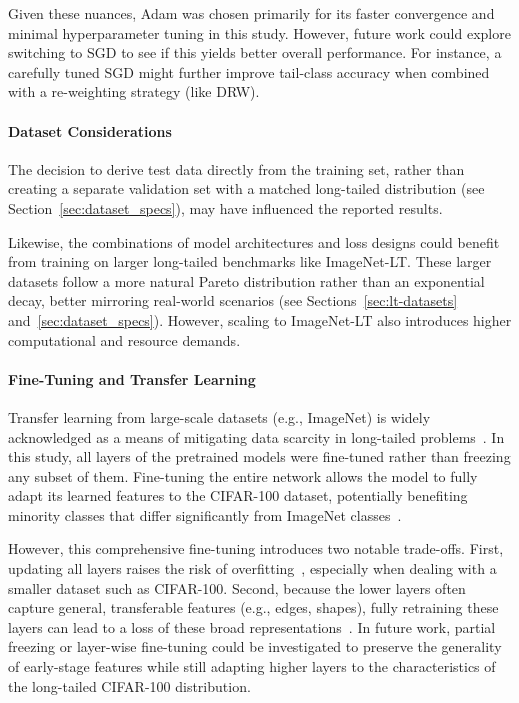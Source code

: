 Given these nuances, Adam was chosen primarily for its faster convergence and minimal hyperparameter tuning in this study. However, future work could explore switching to SGD to see if this yields better overall performance. For instance, a carefully tuned SGD might further improve tail-class accuracy when combined with a re-weighting strategy (like DRW).

\paragraph{Dataset Considerations}
The decision to derive test data directly from the training set, rather than creating a separate validation set with a matched long-tailed distribution (see Section~\ref{sec:dataset_specs}), may have influenced the reported results.

Likewise, the combinations of model architectures and loss designs could benefit from training on larger long-tailed benchmarks like ImageNet-LT. These larger datasets follow a more natural Pareto distribution rather than an exponential decay, better mirroring real-world scenarios (see Sections~\ref{sec:lt-datasets} and~\ref{sec:dataset_specs}). However, scaling to ImageNet-LT also introduces higher computational and resource demands.

\paragraph{Fine-Tuning and Transfer Learning}
Transfer learning from large-scale datasets (e.g., ImageNet) is widely acknowledged as a means of mitigating data scarcity in long-tailed problems~\cite{cs231n,ye2023partialfinetuningsuccessorfinetuning,kandel2020}. In this study, all layers of the pretrained models were fine-tuned rather than freezing any subset of them. Fine-tuning the entire network allows the model to fully adapt its learned features to the CIFAR-100 dataset, potentially benefiting minority classes that differ significantly from ImageNet classes~\cite{ye2023partialfinetuningsuccessorfinetuning}.

However, this comprehensive fine-tuning introduces two notable trade-offs. First, updating all layers raises the risk of overfitting~\cite{cs231n}, especially when dealing with a smaller dataset such as CIFAR-100. Second, because the lower layers often capture general, transferable features (e.g., edges, shapes), fully retraining these layers can lead to a loss of these broad representations~\cite{cs231n,yosinski2014transferablefeaturesdeepneural}. In future work, partial freezing or layer-wise fine-tuning could be investigated to preserve the generality of early-stage features while still adapting higher layers to the characteristics of the long-tailed CIFAR-100 distribution.

